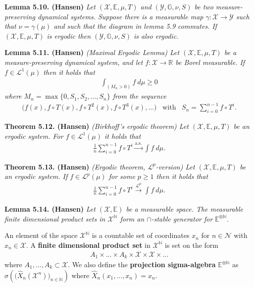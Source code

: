 \documentclass[a4paper,10pt,openany]{book}
\begin{document}
\textbf{Lemma 5.10. (Hansen)} \emph{Let \((\mathcal{X},\mathbb{E},\mu,T)\) and \((\mathcal{Y},\mathbb{G},\nu,S)\) be two measure-preserving dynamical systems. Suppose there is a measurable map \(\gamma : \mathcal{X}\to\mathcal{Y}\) such that \(\nu =\gamma(\mu)\) and such that the diagram in lemma 5.9 commutes.}
\emph{If \((\mathcal{X},\mathbb{E},\mu,T)\) is ergodic then \((\mathcal{Y},\mathbb{G},\nu,S)\) is also ergodic.}

\textbf{Lemma 5.11. (Hansen)} \emph{(Maximal Ergodic Lemma) Let \((\mathcal{X},\mathbb{E},\mu,T)\) be a measure-preserving dynamical system, and let \(f : \mathcal{X}\to \mathbb{R}\) be Borel measurable. If \(f\in \mathcal{L}^1(\mu)\) then it holds that}
\begin{align*}
    \int_{(M_n>0)}f\ d\mu\ge 0\tag{5.14}
\end{align*}
\emph{where \(M_n=\max\{0,S_1,S_2,...,S_n\}\) from the sequence}
\begin{align*}
    \Big(f(x), f\circ T(x),f\circ T^2(x),f\circ T^3(x),...\Big)\hspace{10pt}\text{with}\hspace{10pt}S_n=\sum_{i=0}^{n-1}f\circ T^i.
\end{align*}

\textbf{Theorem 5.12. (Hansen)} \emph{(Birkhoff's ergodic theorem) Let \((\mathcal{X},\mathbb{E},\mu,T)\) be an ergodic system. For \(f\in \mathcal{L}^1(\mu)\) it holds that}
\begin{align*}
    \frac{1}{n}\sum_{i=0}^{n-1}f\circ T^i\stackrel{\text{a.s.}}{\to} \int f\ d\mu.\tag{5.16}
\end{align*}

\textbf{Theorem 5.13. (Hansen)} \emph{(Ergodic theorem, \(\mathcal{L}^p\)-version) Let \((\mathcal{X},\mathbb{E},\mu,T)\) be an ergodic system. If \(f\in \mathcal{L}^p(\mu)\) for some \(p\ge 1\) then it holds that}
\begin{align*}
    \frac{1}{n}\sum_{i=0}^{n-1}f\circ T^i\stackrel{\mathcal{L}^p}{\to}\int f\ d\mu.\tag{5.21}
\end{align*}

\textbf{Lemma 5.14. (Hansen)} \emph{Let \((\mathcal{X},\mathbb{E})\) be a measurable space. The measurable finite dimensional product sets in \(\mathcal{X}^{\mathbb{N}}\) form an \(\cap\)-stable generator for} \({\mathbb{E}}^{\otimes\mathbb{N}}\).

An element of the space \(\mathcal{X}^{\mathbb{N}}\) is a countable set of coordinates \(x_n\) for \(n\in\mathcal{N}\) with \(x_n\in\mathcal{X}\). A \textbf{finite dimensional product set} in \(\mathcal{X}^{\mathbb{N}}\) is set on the form
\begin{align*}
    A_1\times ... \times A_k\times \mathcal{X}\times \mathcal{X}\times ...
\end{align*}
where \(A_1,...,A_k\subset \mathcal{X}\). We also define the \textbf{projection sigma-algebra} \(\mathbb{E}^{\otimes \mathbb{N}}\) as \(\sigma\left(\big(\hat{X}_n(\mathcal{X}^n)\big)_{n\in\mathbb{N}}\right)\) where \(\hat{X}_n(x_1,...,x_n)=x_n\).
\end{document}
